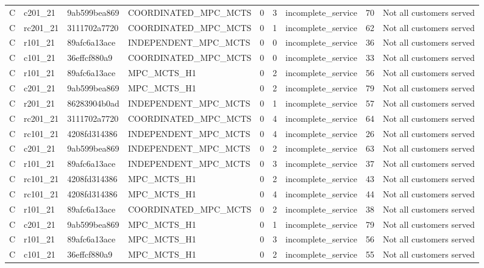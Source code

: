 \begin{table}
{\begin{tabular}{llllrrlrl}
C & c201\_21 & 9ab599bea869 & COORDINATED\_MPC\_MCTS & 0 & 3 & incomplete\_service & 70 & Not all customers served \\
C & rc201\_21 & 3111702a7720 & COORDINATED\_MPC\_MCTS & 0 & 1 & incomplete\_service & 62 & Not all customers served \\
C & r101\_21 & 89afc6a13ace & INDEPENDENT\_MPC\_MCTS & 0 & 0 & incomplete\_service & 36 & Not all customers served \\
C & c101\_21 & 36effcf880a9 & COORDINATED\_MPC\_MCTS & 0 & 0 & incomplete\_service & 33 & Not all customers served \\
C & r101\_21 & 89afc6a13ace & MPC\_MCTS\_H1 & 0 & 2 & incomplete\_service & 56 & Not all customers served \\
C & c201\_21 & 9ab599bea869 & MPC\_MCTS\_H1 & 0 & 2 & incomplete\_service & 79 & Not all customers served \\
C & r201\_21 & 86283904b0ad & INDEPENDENT\_MPC\_MCTS & 0 & 1 & incomplete\_service & 57 & Not all customers served \\
C & rc201\_21 & 3111702a7720 & COORDINATED\_MPC\_MCTS & 0 & 4 & incomplete\_service & 64 & Not all customers served \\
C & rc101\_21 & 4208fd314386 & INDEPENDENT\_MPC\_MCTS & 0 & 4 & incomplete\_service & 26 & Not all customers served \\
C & c201\_21 & 9ab599bea869 & INDEPENDENT\_MPC\_MCTS & 0 & 2 & incomplete\_service & 63 & Not all customers served \\
C & r101\_21 & 89afc6a13ace & INDEPENDENT\_MPC\_MCTS & 0 & 3 & incomplete\_service & 37 & Not all customers served \\
C & rc101\_21 & 4208fd314386 & MPC\_MCTS\_H1 & 0 & 2 & incomplete\_service & 43 & Not all customers served \\
C & rc101\_21 & 4208fd314386 & MPC\_MCTS\_H1 & 0 & 4 & incomplete\_service & 44 & Not all customers served \\
C & r101\_21 & 89afc6a13ace & COORDINATED\_MPC\_MCTS & 0 & 2 & incomplete\_service & 38 & Not all customers served \\
C & c201\_21 & 9ab599bea869 & MPC\_MCTS\_H1 & 0 & 1 & incomplete\_service & 79 & Not all customers served \\
C & r101\_21 & 89afc6a13ace & MPC\_MCTS\_H1 & 0 & 3 & incomplete\_service & 56 & Not all customers served \\
C & c101\_21 & 36effcf880a9 & MPC\_MCTS\_H1 & 0 & 2 & incomplete\_service & 55 & Not all customers served \\

\end{tabular}}
\end{table}
